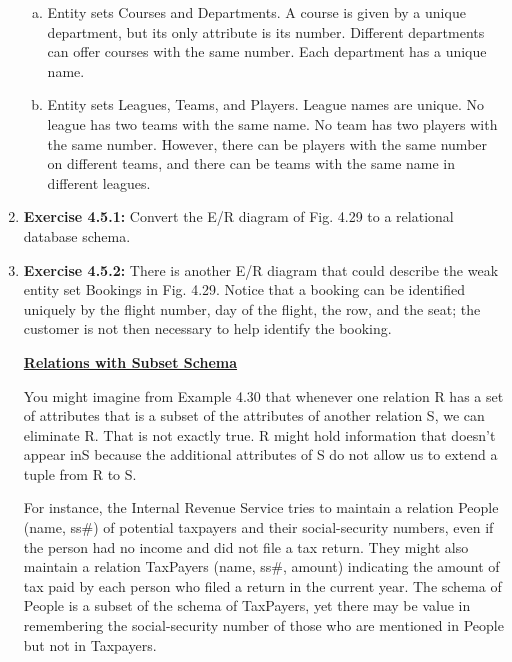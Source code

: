 \documentclass[12pt]{article}
\begin{document}
\begin{enumerate}[1.]
    \begin{enumerate}[a)]
        \item Entity sets Courses and Departments. A course is given by a unique department, but its only attribute is its number. Different departments can offer courses with the same number. Each department has a unique name.
        \item Entity sets Leagues, Teams, and Players. League names are unique. No league has two teams with the same name. No team has two players with the same number. However, there can be players with the same number on different teams, and there can be teams with the same name in different leagues.
    \end{enumerate}

    \item \textbf{Exercise 4.5.1:} Convert the E/R diagram of Fig. 4.29 to a relational database
    schema.

    \item \textbf{Exercise 4.5.2:} There is another E/R diagram that could describe the weak
    entity set Bookings in Fig. 4.29. Notice that a booking can be identified uniquely
    by the flight number, day of the flight, the row, and the seat; the customer is
    not then necessary to help identify the booking.

    \bigskip

    \begin{mdframed}
        \underline{\textbf{Relations with Subset Schema}}

        \bigskip

        You might imagine from Example 4.30 that whenever one relation R has a
        set of attributes that is a subset of the attributes of another relation S, we
        can eliminate R. That is not exactly true. R might hold information that
        doesn't appear inS because the additional attributes of S do not allow us
        to extend a tuple from R to S.

        \bigskip

        For instance, the Internal Revenue Service tries to maintain a relation
        People (name, ss\#) of potential taxpayers and their social-security numbers,
        even if the person had no income and did not file a tax return. They
        might also maintain a relation TaxPayers (name, ss\#, amount) indicating
        the amount of tax paid by each person who filed a return in the current
        year. The schema of People is a subset of the schema of TaxPayers, yet
        there may be value in remembering the social-security number of those
        who are mentioned in People but not in Taxpayers.


\end{mdframed}
\end{enumerate}
\end{document}
